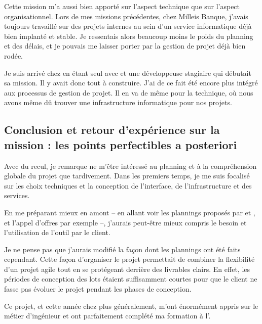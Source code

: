 
Cette mission m'a aussi bien apporté sur l'aspect technique que sur l'aspect organisationnel. Lors de mes missions précédentes, chez Milleis Banque, j'avais toujours travaillé sur des projets internes au sein d'un service informatique déjà bien implanté et stable. Je ressentais alors beaucoup moins le poids du planning et des délais, et je pouvais me laisser porter par la gestion de projet déjà bien rodée.

Je suis arrivé chez \tnp en étant seul avec \damien et une développeuse stagiaire qui débutait sa mission. Il y avait donc tout à construire. J'ai de ce fait été encore plus intégré aux processus de gestion de projet.
Il en va de même pour la technique, où nous avons même dû trouver une infrastructure informatique pour nos projets.

\newpage
\subsection{Conclusion et retour d'expérience sur la mission : les points perfectibles a posteriori}


Avec du recul, je remarque ne m'être intéressé au planning et à la compréhension globale du projet que tardivement. Dans les premiers temps, je me suis focalisé sur les choix techniques et la conception de l'interface, de l'infrastructure et des services.

En me préparant mieux en amont -- en allant voir les plannings proposés par \damien et \gil, et l'appel d'offres par exemple --, j'aurais peut-être mieux compris le besoin et l'utilisation de l'outil par le client.

Je ne pense pas que j'aurais modifié la façon dont les plannings ont été faits cependant. Cette façon d'organiser le projet permettait de combiner la flexibilité d'un projet agile tout en se protégeant derrière des livrables clairs. En effet, les périodes de conception des lots étaient suffisamment courtes pour que le client ne fasse pas évoluer le projet pendant les phases de conception.

Ce projet, et cette année chez \tnp plus généralement, m'ont énormément appris sur le métier d'ingénieur et ont parfaitement complété ma formation à l'\epita.